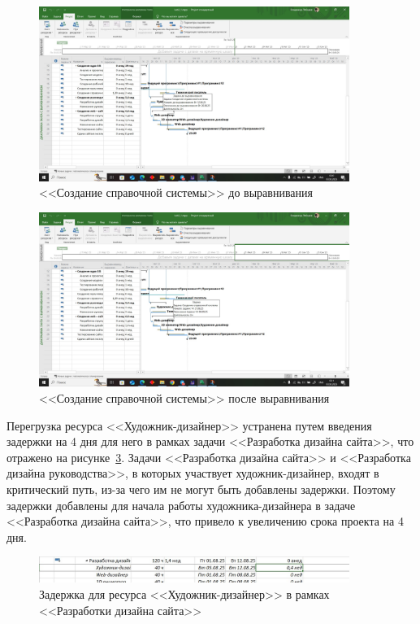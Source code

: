 \begin{figure}[H]
	\centering
	\includegraphics[width=0.9\textwidth]{img/lab3/task1/screen6.jpg}
	\caption{<<Создание справочной системы>> до выравнивания}
	\label{fig:screen6}
\end{figure}

\begin{figure}[H]
	\centering
	\includegraphics[width=0.9\textwidth]{img/lab3/task1/screen7.jpg}
	\caption{<<Создание справочной системы>> после выравнивания}
	\label{fig:screen7}
\end{figure}

Перегрузка ресурса <<Художник-дизайнер>> устранена путем введения задержки на 4 дня для него в рамках задачи <<Разработка дизайна сайта>>, что отражено на рисунке~\ref{fig:screen8}.
Задачи <<Разработка дизайна сайта>> и <<Разработка дизайна руководства>>, в которых участвует художник-дизайнер, входят в критический путь, из-за чего им не могут быть добавлены задержки.
Поэтому задержки добавлены для начала работы художника-дизайнера в задаче <<Разработка дизайна сайта>>, что привело к увеличению срока проекта на 4 дня.

\begin{figure}[H]
	\centering
	\includegraphics[width=0.9\textwidth]{img/lab3/task1/screen8.jpg}
	\caption{Задержка для ресурса <<Художник-дизайнер>> в рамках <<Разработки дизайна сайта>>}
	\label{fig:screen8}
\end{figure}

